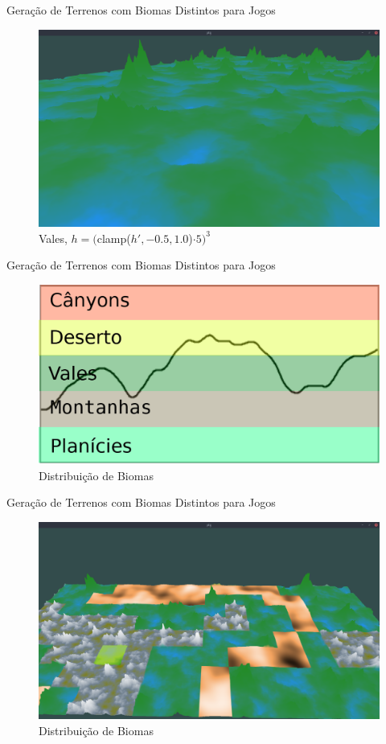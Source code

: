 \begin{frame}{Geração de Terrenos com Biomas Distintos para Jogos}
    \begin{figure}
		\centering
        \includegraphics[width=.8\textwidth]{img/uffs/bssValley.png}
        \caption{Vales, $h = ($clamp($h', -0.5, 1.0$)$\cdot 5)^{3}$}
    \end{figure}
\end{frame}

\begin{frame}{Geração de Terrenos com Biomas Distintos para Jogos}
    \begin{figure}
		\centering
        \includegraphics[width=.8\textwidth]{img/uffs/biomesdistnoise.png}
        \caption{Distribuição de Biomas}
    \end{figure}
\end{frame}

\begin{frame}{Geração de Terrenos com Biomas Distintos para Jogos}
    \begin{figure}
		\centering
        \includegraphics[width=.8\textwidth]{img/uffs/256f4.png}
        \caption{Distribuição de Biomas}
    \end{figure}
\end{frame}

